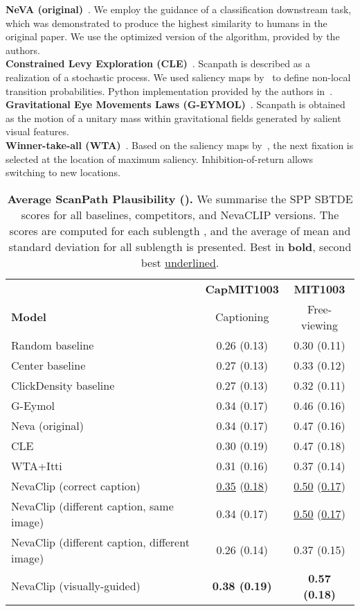 \documentclass{article}
\begin{document}
\textbf{NeVA (original)}~\citep{schwinn2022behind}. We employ the guidance of a classification downstream task, which was demonstrated to produce the highest similarity to humans in the original paper. We use the optimized version of the algorithm, provided by the authors.\\
\textbf{Constrained Levy Exploration (CLE)}~\citep{boccignone2004modelling}. Scanpath is described as a realization of a stochastic process. We used saliency maps by~\citep{itti1998model} to define non-local transition probabilities. Python implementation provided by the authors in~\citep{boccignone2019look}.\\
\textbf{Gravitational Eye Movements Laws (G-EYMOL)}~\citep{zanca2019gravitational}. Scanpath is obtained as the motion of a unitary mass within gravitational fields generated by salient visual features.\\
\textbf{Winner-take-all (WTA)}~\citep{koch1987shifts}. Based on the saliency maps by~\citet{itti1998model}, the next fixation is selected at the location of maximum saliency. Inhibition-of-return allows switching to new locations.


\begin{table}[t]
\caption{\textbf{Average ScanPath Plausibility ().} We summarise the SPP SBTDE scores for all baselines, competitors, and NevaCLIP versions. The scores are computed for each sublength , and the average of mean and standard deviation for all sublength is presented. Best in \textbf{bold}, second best \underline{underlined}.}
\centering
\begin{tabular}{lcc}
\hline
\textbf{} & \textbf{CapMIT1003} & \textbf{MIT1003} \\
\textbf{Model} & Captioning & Free-viewing \\
\hline
\hline
Random baseline & 0.26 (0.13) & 0.30 (0.11)  \\
Center baseline & 0.27 (0.13) & 0.33 (0.12) \\
ClickDensity baseline & 0.27 (0.13) & 0.32 (0.11) \\
\hline
G-Eymol & 0.34 (0.17) & 0.46 (0.16) \\
Neva (original) & 0.34 (0.17)
 & 0.47 (0.16) \\
CLE & 0.30 (0.19)
 & 0.47 (0.18) \\
WTA+Itti & 0.31 (0.16) & 0.37 (0.14) \\
\hline
NevaClip (correct caption) & \underline{0.35} (\underline{0.18}) & \underline{0.50} (\underline{0.17}) \\
NevaClip (different caption, same image) & 0.34 (0.17) & \underline{0.50} (\underline{0.17}) \\
NevaClip (different caption, different image) & 0.26 (0.14) & 0.37 (0.15) \\
NevaClip (visually-guided) & \textbf{0.38 (0.19)} & \textbf{0.57 (0.18)} \\
\hline
\end{tabular}
\label{tab:all_results}
\end{table}
\end{document}

